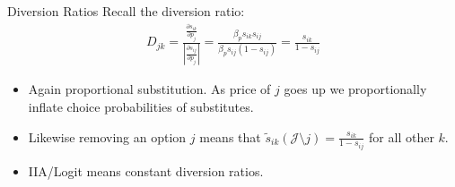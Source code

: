 \documentclass[aspectratio=169,11pt]{beamer}
\begin{document}
\begin{frame}{Diversion Ratios}
Recall the diversion ratio:
\begin{align*}
D_{jk} =\frac{\frac{\partial s_{ik}}{\partial p_{j}}}{\left |\frac{\partial s_{ij}}{\partial p_{j}} \right|} = \frac{\beta_p s_{ik} s_{ij}}{\beta_p s_{ij} (1-s_{ij})} = \frac{s_{ik}}{1-s_{ij}}
\end{align*}
\begin{itemize}
\item Again proportional substitution. As price of $j$ goes up we proportionally inflate choice probabilities of substitutes.
\item Likewise removing an option $j$ means that $\tilde{s}_{ik}(\mathcal{J} \setminus j) = \frac{s_{ik}}{1-s_{ij}}$ for all other $k$.
\item IIA/Logit means \alert{constant diversion ratios}.
\end{itemize}
\end{frame}
%
%
%
%
%
%
%
\end{document}
